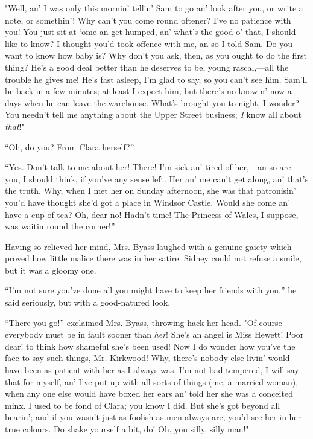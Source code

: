 "Well, an' I was only this mornin' tellin' Sam to go an' look after you,
or write a note, or somethin'! Why can't you come round oftener? I've no
patience with you! You just sit at `ome an get humped, an' what's the
good o' that, I should like to know? I thought you'd took offence with
me, an so I told Sam. Do you want to know how baby is? Why don't you
ask, then, as you ought to do the first thing? He's a good deal better
than he deserves to be, young rascal,---all the trouble he gives me!
He's fast {\protect\hypertarget{157}{}{}}asleep, I'm glad to say, so you
can't see him. Sam'll be back in a few minutes; at least I expect him,
but there's no knowin' now-a-days when he can leave the warehouse.
What's brought you to-night, I wonder? You needn't tell me anything
about the Upper Street business; \emph{I} know all about \emph{that}!"

``Oh, do you? From Clara herself?''

``Yes. Don't talk to me about her! There! I'm sick an' tired of
her,---an so are you, I should think, if you've any sense left. Her an'
me can't get along, an' that's the truth. Why, when I met her on Sunday
afternoon, she was that patronisin' you'd have thought she'd got a place
in Windsor Castle. Would she come an' have a cup of tea? Oh, dear no!
Hadn't time! The Princess of Wales, I suppose, was waitin round the
corner!''

Having so relieved her mind, Mrs. Byass laughed with a genuine gaiety
which proved how little malice there was in her satire. Sidney could not
refuse a smile, but it was a gloomy one.

{\protect\hypertarget{158}{}{}}``I'm not sure you've done all you might
have to keep her friends with you,'' he said seriously, but with a
good-natured look.

``There you go!'' exclaimed Mrs. Byass, throwing hack her head. "Of
course everybody must be in fault sooner than \emph{her}! She's an angel
is Miss Hewett! Poor dear! to think how shameful she's been used! Now I
do wonder how you've the face to say such things, Mr. Kirkwood! Why,
there's nobody else livin' would have been as patient with her as I
always was. I'm not bad-tempered, I will say that for myself, an' I've
put up with all sorts of things (me, a married woman), when any one else
would have boxed her ears an' told her she was a conceited minx. I used
to be fond of Clara; you know I did. But she's got beyond all bearin';
and if you wasn't just as foolish as men always are, you'd see her in
her true colours. Do shake yourself a bit, do! Oh, you silly, silly
man!"

